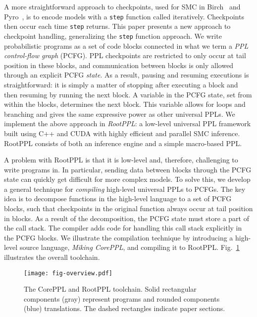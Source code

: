 \documentclass[runningheads]{llncs}
\begin{document}
A more straightforward approach to checkpoints, used for SMC in Birch~\cite{murray2018automated} and Pyro~\cite{bingham2019pyro}, is to encode models with a \lstinline!step! function called iteratively.
Checkpoints then occur each time \lstinline!step! returns.
This paper presents a new approach to checkpoint handling, generalizing the \lstinline!step! function approach.
We write probabilistic programs as a set of code blocks connected in what we term a \emph{PPL control-flow graph} (PCFG).
PPL checkpoints are restricted to only occur at tail position in these blocks, and communication between blocks is only allowed through an explicit PCFG \emph{state}.
As a result, pausing and resuming executions is straightforward: it is simply a matter of stopping after executing a block and then resuming by running the next block.
A variable in the PCFG state, set from within the blocks, determines the next block.
This variable allows for loops and branching and gives the same expressive power as other universal PPLs.
We implement the above approach in \emph{RootPPL}: a low-level universal PPL framework built using C++ and CUDA with highly efficient and parallel SMC inference.
RootPPL consists of both an inference engine and a simple macro-based PPL.

A problem with RootPPL is that it is low-level and, therefore, challenging to write programs in.
In particular, sending data between blocks through the PCFG state can quickly get difficult for more complex models.
To solve this, we develop a general technique for \emph{compiling} high-level universal PPLs to PCFGs.
The key idea is to decompose functions in the high-level language to a set of PCFG blocks, such that checkpoints in the original function always occur at tail position in blocks.
As a result of the decomposition, the PCFG state must store a part of the call stack.
The compiler adds code for handling this call stack explicitly in the PCFG blocks.
We illustrate the compilation technique by introducing a high-level source language, \emph{Miking CorePPL}, and compiling it to RootPPL.
Fig.~\ref{fig:overview} illustrates the overall toolchain.
\begin{figure}[tb]
\centering
\texttt{[image: fig-overview.pdf]}
\caption{%
  The CorePPL and RootPPL toolchain. Solid rectangular components (gray) represent programs and rounded components (blue) translations.
  The dashed rectangles indicate paper sections.
}
\label{fig:overview}
\end{figure}
\end{document}

